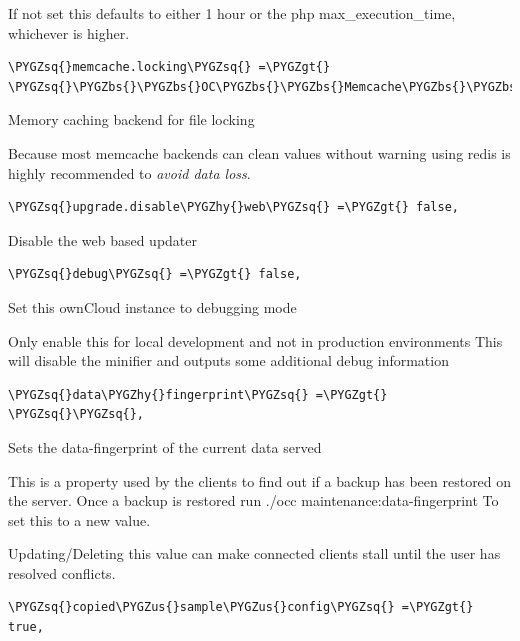 \documentclass[letterpaper,10pt,english]{sphinxmanual}
\def\PYGZbs{\char`\\}
\def\PYGZus{\char`\_}
\def\PYGZgt{\char`\>}
\def\PYGZhy{\char`\-}
\def\PYGZsq{\char`\'}
\renewcommand\PYGZsq{\textquotesingle}
\begin{document}
If not set this defaults to either 1 hour or the php max\_execution\_time, whichever is higher.

\begin{Verbatim}[commandchars=\\\{\}]
\PYGZsq{}memcache.locking\PYGZsq{} =\PYGZgt{} \PYGZsq{}\PYGZbs{}\PYGZbs{}OC\PYGZbs{}\PYGZbs{}Memcache\PYGZbs{}\PYGZbs{}Redis\PYGZsq{},
\end{Verbatim}

Memory caching backend for file locking

Because most memcache backends can clean values without warning using redis
is highly recommended to \emph{avoid data loss}.

\begin{Verbatim}[commandchars=\\\{\}]
\PYGZsq{}upgrade.disable\PYGZhy{}web\PYGZsq{} =\PYGZgt{} false,
\end{Verbatim}

Disable the web based updater

\begin{Verbatim}[commandchars=\\\{\}]
\PYGZsq{}debug\PYGZsq{} =\PYGZgt{} false,
\end{Verbatim}

Set this ownCloud instance to debugging mode

Only enable this for local development and not in production environments
This will disable the minifier and outputs some additional debug information

\begin{Verbatim}[commandchars=\\\{\}]
\PYGZsq{}data\PYGZhy{}fingerprint\PYGZsq{} =\PYGZgt{} \PYGZsq{}\PYGZsq{},
\end{Verbatim}

Sets the data-fingerprint of the current data served

This is a property used by the clients to find out if a backup has been
restored on the server. Once a backup is restored run
./occ maintenance:data-fingerprint
To set this to a new value.

Updating/Deleting this value can make connected clients stall until
the user has resolved conflicts.

\begin{Verbatim}[commandchars=\\\{\}]
\PYGZsq{}copied\PYGZus{}sample\PYGZus{}config\PYGZsq{} =\PYGZgt{} true,
\end{Verbatim}
\end{document}
